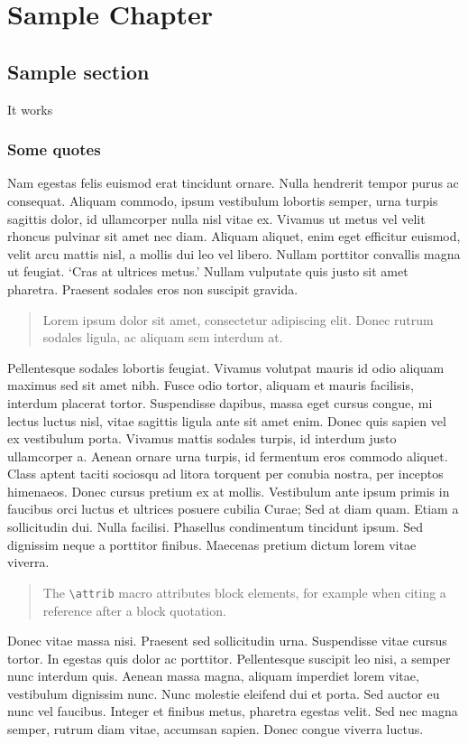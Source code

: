 \documentclass[../main/Progress.tex]{subfiles}
\begin{document}
\chapter[Sample Chapter]{Sample Chapter}

\section{Sample section}
It works

\subsection{Some quotes}

Nam egestas felis euismod erat tincidunt ornare. Nulla hendrerit tempor purus ac consequat. Aliquam commodo, ipsum vestibulum lobortis semper, urna turpis sagittis dolor, id ullamcorper nulla nisl vitae ex. Vivamus ut metus vel velit rhoncus pulvinar sit amet nec diam. Aliquam aliquet, enim eget efficitur euismod, velit arcu mattis nisl, a mollis dui leo vel libero. Nullam porttitor convallis magna ut feugiat. `Cras at ultrices metus.' Nullam vulputate quis justo sit amet pharetra. Praesent sodales eros non suscipit gravida.
\begin{quote}
Lorem ipsum dolor sit amet, consectetur adipiscing elit. Donec rutrum sodales ligula, ac aliquam sem interdum at.
\end{quote}

Pellentesque sodales lobortis feugiat. Vivamus volutpat mauris id odio aliquam maximus sed sit amet nibh. Fusce odio tortor, aliquam et mauris facilisis, interdum placerat tortor. Suspendisse dapibus, massa eget cursus congue, mi lectus luctus nisl, vitae sagittis ligula ante sit amet enim. Donec quis sapien vel ex vestibulum porta. Vivamus mattis sodales turpis, id interdum justo ullamcorper a. Aenean ornare urna turpis, id fermentum eros commodo aliquet. Class aptent taciti sociosqu ad litora torquent per conubia nostra, per inceptos himenaeos. Donec cursus pretium ex at mollis. Vestibulum ante ipsum primis in faucibus orci luctus et ultrices posuere cubilia Curae; Sed at diam quam. Etiam a sollicitudin dui. Nulla facilisi. Phasellus condimentum tincidunt ipsum. Sed dignissim neque a porttitor finibus. Maecenas pretium dictum lorem vitae viverra.
\begin{quote}
The \verb|\attrib| macro attributes block elements, for example when citing
a reference after a block quotation.
\ifdefined\attrib{}\fi
\end{quote}

Donec vitae massa nisi. Praesent sed sollicitudin urna. Suspendisse vitae cursus tortor. In egestas quis dolor ac porttitor. Pellentesque suscipit leo nisi, a semper nunc interdum quis. Aenean massa magna, aliquam imperdiet lorem vitae, vestibulum dignissim nunc. Nunc molestie eleifend dui et porta. Sed auctor eu nunc vel faucibus. Integer et finibus metus, pharetra egestas velit. Sed nec magna semper, rutrum diam vitae, accumsan sapien. Donec congue viverra luctus.
\end{document}

